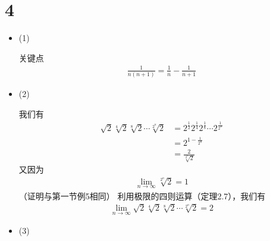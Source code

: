 \documentclass{article}
\begin{document}
\section*{4}

\begin{itemize}
  \item (1)

        关键点
        \begin{align*}
          \frac{1}{n(n + 1)} = \frac{1}{n} - \frac{1}{n + 1}
        \end{align*}

  \item (2)

        我们有
        \begin{align*}
          \sqrt{2} \sqrt[4]{2} \sqrt[8]{2}\cdots \sqrt[2^n]{2}
           & = 2^{\frac{1}{2}} 2^{\frac{1}{4}} 2^{\frac{1}{8}} \cdots 2^{\frac{1}{2^n}} \\
           & = 2^{1 - \frac{1}{2^n}}                                                    \\
           & = \frac{2}{\sqrt[2^n]{2}}
        \end{align*}
        又因为
        \begin{align*}
          \lim\limits_{n \to \infty} \sqrt[2^n]{2} = 1
        \end{align*}
        （证明与第一节例5相同）
        利用极限的四则运算（定理2.7），我们有
        \begin{align*}
          \lim\limits_{n \to \infty} \sqrt{2} \sqrt[4]{2} \sqrt[8]{2}\cdots \sqrt[2^n]{2}
          = 2
        \end{align*}

  \item (3)


\end{itemize}
\end{document}
